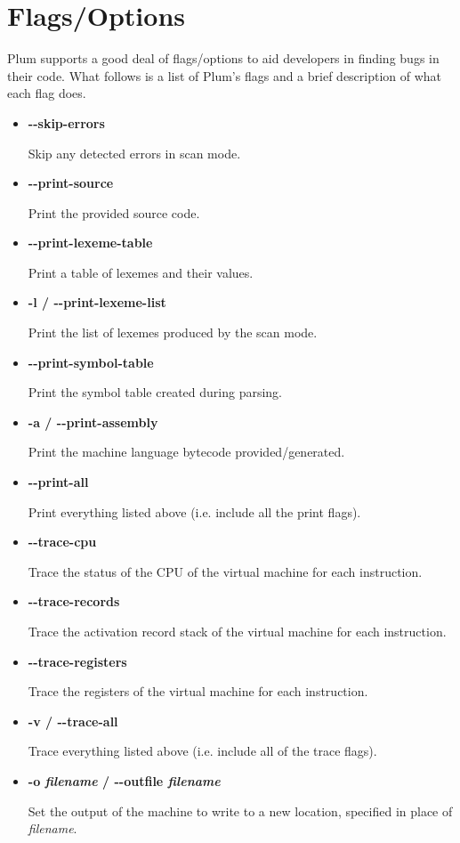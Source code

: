 \documentclass{article}
\begin{document}
\section*{Flags/Options}
Plum supports a good deal of flags/options to aid developers in finding bugs in their code.
What follows is a list of Plum's flags and a brief description of what each flag does.
\begin{itemize}
    \item \textbf{{-}{-}skip-errors}

        Skip any detected errors in scan mode.

    \item \textbf{{-}{-}print-source}

        Print the provided source code.

    \item \textbf{{-}{-}print-lexeme-table}
        
        Print a table of lexemes and their values.

    \item \textbf{-l / {-}{-}print-lexeme-list}

        Print the list of lexemes produced by the scan mode.

    \item \textbf{{-}{-}print-symbol-table}

        Print the symbol table created during parsing.

    \item \textbf{-a / {-}{-}print-assembly}
    
        Print the machine language bytecode provided/generated.

    \item \textbf{{-}{-}print-all}
        
        Print everything listed above (i.e. include all the print flags).

    \item \textbf{{-}{-}trace-cpu}
    
        Trace the status of the CPU of the virtual machine for each instruction.

    \item \textbf{{-}{-}trace-records}

        Trace the activation record stack of the virtual machine for each instruction.

    \item \textbf{{-}{-}trace-registers}

        Trace the registers of the virtual machine for each instruction.

    \item \textbf{-v / {-}{-}trace-all}

        Trace everything listed above (i.e. include all of the trace flags).

    \item \textbf{-o \emph{filename} / {-}{-}outfile \emph{filename}}

        Set the output of the machine to write to a new location, specified in place
        of \emph{filename}.

\end{itemize}
\end{document}
